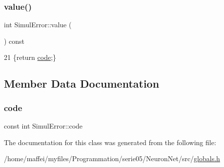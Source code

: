 \subsubsection{\texorpdfstring{value()}{value()}}
{\footnotesize\ttfamily int Simul\+Error\+::value (\begin{DoxyParamCaption}{ }\end{DoxyParamCaption}) const\hspace{0.3cm}{\ttfamily [inline]}}


\begin{DoxyCode}
21 \{\textcolor{keywordflow}{return} \hyperlink{classSimulError_a5cd98a7eddc7982f5c715ef1c76a1bc2}{code};\}
\end{DoxyCode}


\subsection{Member Data Documentation}
\mbox{\label{classSimulError_a5cd98a7eddc7982f5c715ef1c76a1bc2}} 
\subsubsection{\texorpdfstring{code}{code}}
{\footnotesize\ttfamily const int Simul\+Error\+::code\hspace{0.3cm}{\ttfamily [protected]}}



The documentation for this class was generated from the following file\+:\begin{DoxyCompactItemize}
\item 
/home/maffei/myfiles/\+Programmation/serie05/\+Neuron\+Net/src/\hyperlink{globals_8h}{globals.\+h}\end{DoxyCompactItemize}
